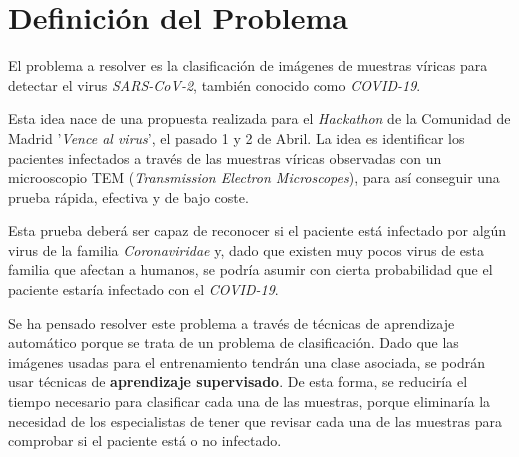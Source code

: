 \documentclass{uc3mpracticas}
\begin{document}
  \frontmatter



  \vspace{40mm}


  \newpage


  \tableofcontents

  \listoffigures
  \newpage

  \mainmatter


  \section{Definición del Problema}

  El problema a resolver es la clasificación de imágenes de muestras víricas para detectar el virus \textit{SARS-CoV-2}, también conocido como \textit{COVID-19}.

  \vspace{2mm}

  Esta idea nace de una propuesta realizada para el \textit{Hackathon} de la Comunidad de Madrid '\textit{Vence al virus}', el pasado 1 y 2 de Abril. La idea es identificar los pacientes infectados a través de las muestras víricas observadas con un microoscopio TEM (\textit{Transmission Electron Microscopes}), para así conseguir una prueba rápida, efectiva y de bajo coste.

  \vspace{2mm}

  Esta prueba deberá ser capaz de reconocer si el paciente está infectado por algún virus de la familia \textit{Coronaviridae} y, dado que existen muy pocos virus de esta familia que afectan a humanos, se podría asumir con cierta probabilidad que el paciente estaría infectado con el \textit{COVID-19}.

  \vspace{3mm}

  Se ha pensado resolver este problema a través de técnicas de aprendizaje automático porque se trata de un problema de clasificación. Dado que las imágenes usadas para el entrenamiento tendrán una clase asociada, se podrán usar técnicas de \textbf{aprendizaje supervisado}. De esta forma, se reduciría el tiempo necesario para clasificar cada una de las muestras, porque eliminaría la necesidad de los especialistas de tener que revisar cada una de las muestras para comprobar si el paciente está o no infectado.
\end{document}
